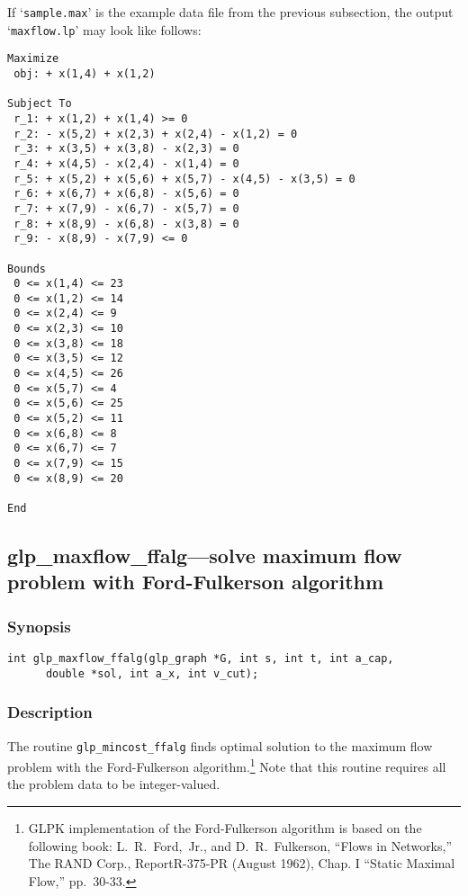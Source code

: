 If `\verb|sample.max|' is the example data file from the previous
subsection, the output `\verb|maxflow.lp|' may look like follows:

\begin{footnotesize}
\begin{verbatim}
Maximize
 obj: + x(1,4) + x(1,2)

Subject To
 r_1: + x(1,2) + x(1,4) >= 0
 r_2: - x(5,2) + x(2,3) + x(2,4) - x(1,2) = 0
 r_3: + x(3,5) + x(3,8) - x(2,3) = 0
 r_4: + x(4,5) - x(2,4) - x(1,4) = 0
 r_5: + x(5,2) + x(5,6) + x(5,7) - x(4,5) - x(3,5) = 0
 r_6: + x(6,7) + x(6,8) - x(5,6) = 0
 r_7: + x(7,9) - x(6,7) - x(5,7) = 0
 r_8: + x(8,9) - x(6,8) - x(3,8) = 0
 r_9: - x(8,9) - x(7,9) <= 0

Bounds
 0 <= x(1,4) <= 23
 0 <= x(1,2) <= 14
 0 <= x(2,4) <= 9
 0 <= x(2,3) <= 10
 0 <= x(3,8) <= 18
 0 <= x(3,5) <= 12
 0 <= x(4,5) <= 26
 0 <= x(5,7) <= 4
 0 <= x(5,6) <= 25
 0 <= x(5,2) <= 11
 0 <= x(6,8) <= 8
 0 <= x(6,7) <= 7
 0 <= x(7,9) <= 15
 0 <= x(8,9) <= 20

End
\end{verbatim}
\end{footnotesize}

\subsection{glp\_maxflow\_ffalg---solve maximum flow problem with
Ford-Fulkerson algorithm}

\subsubsection*{Synopsis}

\begin{verbatim}
int glp_maxflow_ffalg(glp_graph *G, int s, int t, int a_cap,
      double *sol, int a_x, int v_cut);
\end{verbatim}

\subsubsection*{Description}

The routine \verb|glp_mincost_ffalg| finds optimal solution to the
maximum flow problem with the Ford-Fulkerson algorithm.\footnote{GLPK
implementation of the Ford-Fulkerson algorithm is based on the following
book: L.~R.~Ford,~Jr., and D.~R.~Fulkerson, ``Flows in Networks,'' The
RAND Corp., Report\linebreak R-375-PR (August 1962), Chap. I
``Static Maximal Flow,'' pp.~30-33.} Note that this routine requires all
the problem data to be integer-valued.

